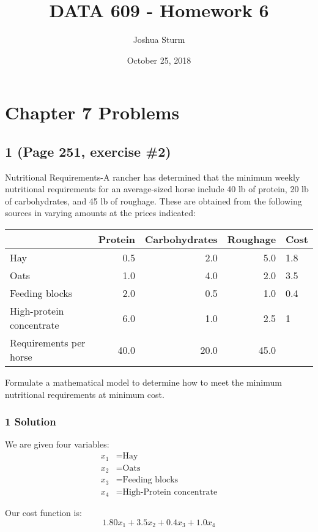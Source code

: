 \documentclass[]{article}
\title{DATA 609 - Homework 6}
\author{Joshua Sturm}
\date{October 25, 2018}
\begin{document}
\maketitle

\hypertarget{chapter-7-problems}{%
\section{Chapter 7 Problems}\label{chapter-7-problems}}

\hypertarget{page-251-exercise-2}{%
\subsection{1 (Page 251, exercise \#2)}\label{page-251-exercise-2}}

Nutritional Requirements-A rancher has determined that the minimum
weekly nutritional requirements for an average-sized horse include 40 lb
of protein, 20 lb of carbohydrates, and 45 lb of roughage. These are
obtained from the following sources in varying amounts at the prices
indicated:

\begin{longtable}[]{@{}lrrrl@{}}
\toprule
& Protein & Carbohydrates & Roughage & Cost\tabularnewline
\midrule
\endhead
Hay & 0.5 & 2.0 & 5.0 & 1.8\tabularnewline
Oats & 1.0 & 4.0 & 2.0 & 3.5\tabularnewline
Feeding blocks & 2.0 & 0.5 & 1.0 & 0.4\tabularnewline
High-protein concentrate & 6.0 & 1.0 & 2.5 & 1\tabularnewline
Requirements per horse & 40.0 & 20.0 & 45.0 &\tabularnewline
\bottomrule
\end{longtable}

Formulate a mathematical model to determine how to meet the minimum
nutritional requirements at minimum cost.

\hypertarget{solution}{%
\subsubsection{1 Solution}\label{solution}}

We are given four variables: \begin{align*}
x_1 &= \text{Hay} \\
x_2 &= \text{Oats} \\
x_3 &= \text{Feeding blocks} \\
x_4 &= \text{High-Protein concentrate}
\end{align*}

Our cost function is: \[
1.80x_1 + 3.5x_2 + 0.4x_3 + 1.0x_4
\]
\end{document}
